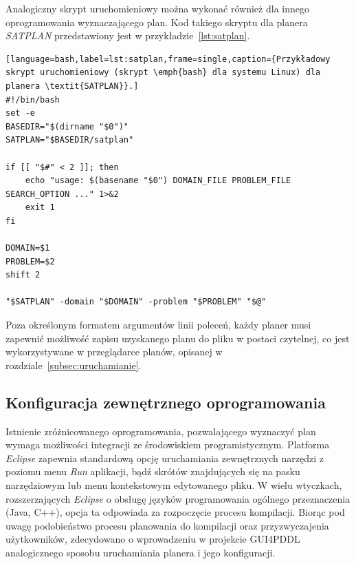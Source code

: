 Analogiczny skrypt uruchomieniowy można wykonać również dla innego oprogramowania wyznaczającego plan. Kod takiego skryptu dla planera \emph{SATPLAN} przedstawiony jest w przykładzie~\ref{lst:satplan}. 
  
\begin{Code}
\begin{lstlisting}[language=bash,label=lst:satplan,frame=single,caption={Przykładowy skrypt uruchomieniowy (skrypt \emph{bash} dla systemu Linux) dla planera \textit{SATPLAN}}.]
#!/bin/bash
set -e
BASEDIR="$(dirname "$0")"
SATPLAN="$BASEDIR/satplan"

if [[ "$#" < 2 ]]; then
    echo "usage: $(basename "$0") DOMAIN_FILE PROBLEM_FILE SEARCH_OPTION ..." 1>&2
    exit 1
fi

DOMAIN=$1
PROBLEM=$2
shift 2

"$SATPLAN" -domain "$DOMAIN" -problem "$PROBLEM" "$@"
\end{lstlisting}
\end{Code}

Poza określonym formatem argumentów linii poleceń, każdy planer musi zapewnić możliwość zapisu uzyskanego planu do pliku w postaci czytelnej, co jest wykorzystywane w przeglądarce planów, opisanej w rozdziale~\ref{subsec:uruchamianie}.

\subsection{Konfiguracja zewnętrznego oprogramowania}
\label{subsec:konfiguracja}
Istnienie zróżnicowanego oprogramowania, pozwalającego wyznaczyć plan wymaga możliwości integracji ze środowiskiem programistycznym. Platforma \emph{Eclipse} zapewnia standardową opcję uruchamiania zewnętrznych narzędzi z poziomu menu \emph{Run} aplikacji, bądź skrótów znajdujących się na pasku narzędziowym lub menu kontekstowym edytowanego pliku. W wielu wtyczkach, rozszerzających \emph{Eclipse} o obsługę języków programowania ogólnego przeznaczenia (Java, C++), opcja ta odpowiada za rozpoczęcie procesu kompilacji. Biorąc pod uwagę podobieństwo procesu planowania do kompilacji oraz przyzwyczajenia użytkowników, zdecydowano o wprowadzeniu w projekcie GUI4PDDL analogicznego sposobu uruchamiania planera i jego konfiguracji.

